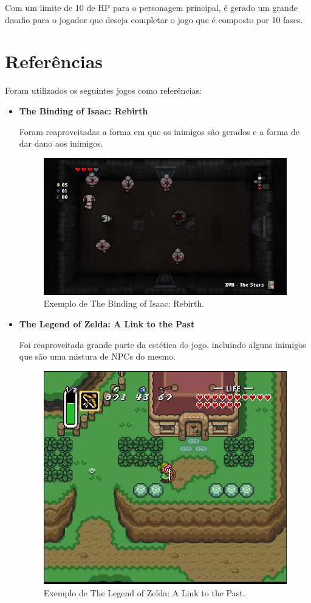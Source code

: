 \documentclass[a4paper]{scrreprt}
\begin{document}
    Com um limite de 10 de HP para o personagem principal, é gerado um grande desafio para o jogador que deseja completar o jogo que é composto por 10 fases.




\chapter{Referências} 
    Foram utilizados os seguintes jogos como referências:
    \begin{itemize}
        \item \textbf{The Binding of Isaac: Rebirth}
        
        Foram reaproveitadas a forma em que os inimigos são gerados e a forma de dar dano aos inimigos.
        
        \begin{figure}[H]
            \centering
            \includegraphics[width=.6\linewidth]{isac.jpg}
            \caption{Exemplo de The Binding of Isaac: Rebirth.}
            \label{fig:isac}
        \end{figure}
        
        \item \textbf{The Legend of Zelda: A Link to the Past}
        
        Foi reaproveitada grande parte da estética do jogo, incluindo alguns inimigos que são uma mistura de NPCs do mesmo.
        
        \begin{figure}[H]
            \centering
            \includegraphics[width=.6\linewidth]{zelda.jpg}
            \caption{Exemplo de The Legend of Zelda: A Link to the Past.}
            \label{fig:zelda}
        \end{figure}
    \end{itemize}
\end{document}
